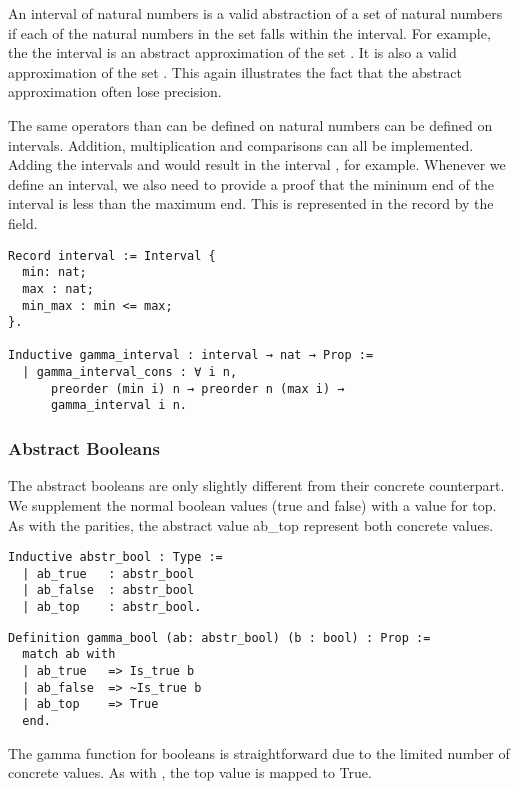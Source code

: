 An interval of natural numbers is a valid abstraction of a set of natural
numbers if each of the natural numbers in the set falls within the interval.
For example, the the interval \coq{[1,5] } is an abstract approximation of the set
. It is also a valid approximation of the set . 
This again illustrates the fact that the abstract approximation often lose 
precision.

The same operators than can be defined on natural numbers can be defined on
intervals. Addition, multiplication and comparisons can all be implemented.
Adding the intervals \coq{[1,3] } and \coq{[4, 7] }  would result in the 
interval \coq{[5, 10] }, for example. Whenever we define an interval, we also need to provide a
proof that the mininum end of the interval is less than the maximum end. This
is represented in the record by the  field.

\begin{listing}
\begin{verbatim}
Record interval := Interval {
  min: nat;
  max : nat;
  min_max : min <= max;
}.

Inductive gamma_interval : interval → nat → Prop :=
  | gamma_interval_cons : ∀ i n, 
      preorder (min i) n → preorder n (max i) →
      gamma_interval i n.
\end{verbatim}
\end{listing}

\subsubsection{Abstract Booleans}
The abstract booleans are only slightly different from their concrete
counterpart. We supplement the normal boolean values (true and false) with
a value for top. As with the parities, the abstract value ab\_top
represent both concrete values.

\begin{verbatim}
Inductive abstr_bool : Type :=
  | ab_true   : abstr_bool
  | ab_false  : abstr_bool
  | ab_top    : abstr_bool.
\end{verbatim}

\begin{verbatim}
Definition gamma_bool (ab: abstr_bool) (b : bool) : Prop :=
  match ab with
  | ab_true   => Is_true b
  | ab_false  => ~Is_true b
  | ab_top    => True
  end.
\end{verbatim}

The gamma function for booleans is straightforward due to the limited
number of concrete values. As with , the top 
value is mapped to True.

